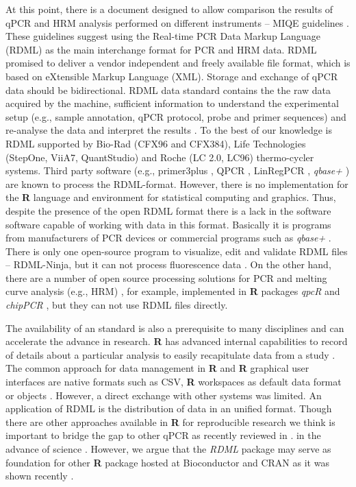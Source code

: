 \documentclass{bioinfo}
\begin{document}
At this point, there is a document designed to allow comparison the results of 
qPCR and HRM analysis performed on different instruments -- MIQE guidelines 
\cite{bustin_miqe_2009, huggett_2013}. These guidelines suggest using the 
Real-time PCR Data Markup Language (RDML) as the main interchange format for PCR 
and HRM data. RDML promised to deliver a vendor independent and freely available 
file format, which is based on eXtensible Markup Language (XML). Storage and 
exchange of qPCR data should be bidirectional. RDML data standard contains the 
the raw data acquired by the machine, sufficient information to understand the 
experimental setup (e.g., sample annotation, qPCR protocol, probe and primer 
sequences) and re-analyse the data and interpret the results 
\cite{lefever_rdml:_2009}. To the best of our knowledge is RDML supported by 
Bio-Rad (CFX96 and CFX384), Life Technologies (StepOne, ViiA7, QuantStudio) and 
Roche (LC 2.0, LC96) thermo-cycler systems. Third party software (e.g., 
primer3plus \cite{untergasser_2007}, QPCR \cite{pabinger_2009}, LinRegPCR 
\cite{ruijter_2014}, \textit{qbase+} \cite{hellemans_2007}) are known to process 
the RDML-format. However, there is no implementation for the \textbf{R} language 
and environment for statistical computing and graphics. Thus, despite the 
presence of the open RDML format there is a lack in the software software 
capable of working with data in this format. Basically it is programs from 
manufacturers of PCR devices or commercial programs such as \textit{qbase+} 
\cite{rdml}. There is only one open-source program to visualize, edit and validate RDML files -- RDML-Ninja, but it can not process fluorescence data \cite{rdml-ninja_2015}. On the other hand, there are a number of open source processing 
solutions for PCR and melting curve analysis (e.g., HRM) 
\cite{roediger_RJ_2013,cousins_2012}, for example, implemented in \textbf{R} 
packages \textit{qpcR}\cite{ritz_qpcr:_2008} and \textit{chipPCR} 
\cite{rodiger2015chippcr}, but they can not use RDML files directly.

The availability of an standard is also a prerequisite to many disciplines and 
can accelerate the advance in research. \textbf{R} has advanced internal 
capabilities to record of details about a particular analysis to easily 
recapitulate data from a study \cite{liu_2014}. The common approach for data 
management in \textbf{R} and \textbf{R} graphical user interfaces are native 
formats such as CSV, \textbf{R} workspaces as default data format or objects 
\cite{rodiger_rkward_2012, pabinger_2014, RDCT2014c}. However, a direct exchange 
with other systems was limited. An application of RDML is the distribution of 
data in an unified format. Though there are other approaches available in 
\textbf{R} for reproducible research \cite{Leeper_2014} we think is important to 
bridge the gap to other qPCR as recently reviewed in \cite{pabinger_2014}. in 
the advance of science \cite{gentleman_2004}. However, we argue that the 
\textit{RDML} package may serve as foundation for other \textbf{R} package 
hosted at Bioconductor \cite{gentleman_2004} and CRAN \cite{RCT} as it was shown recently \cite{rodiger2015r}. 
\end{document}
